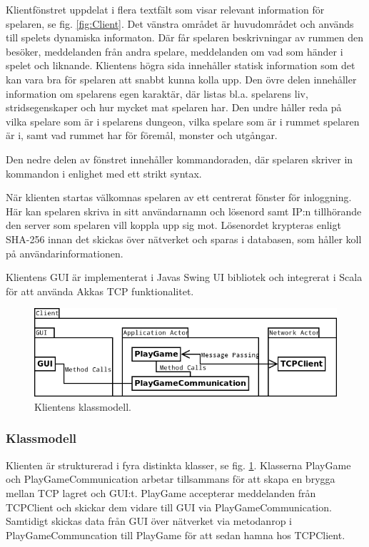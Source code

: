 \documentclass[a4paper]{article}
\begin{document}
Klientfönstret uppdelat i flera textfält som visar relevant information för spelaren, se fig. \ref{fig:Client}. Det vänstra området är huvudområdet och används till spelets dynamiska informaton. Där får spelaren beskrivningar av rummen den besöker, meddelanden från andra spelare, meddelanden om vad som händer i spelet och liknande. Klientens högra sida innehåller statisk information som det kan vara bra för spelaren att snabbt kunna kolla upp. Den övre delen innehåller information om spelarens egen karaktär, där listas bl.a. spelarens liv, stridsegenskaper och hur mycket mat spelaren har. Den undre håller reda på vilka spelare som är i spelarens dungeon, vilka spelare som är i rummet spelaren är i, samt vad rummet har för föremål, monster och utgångar.   

Den nedre delen av fönstret innehåller kommandoraden, där spelaren skriver in kommandon i enlighet med ett strikt syntax. 

När klienten startas välkomnas spelaren av ett centrerat fönster för inloggning. Här kan spelaren skriva in sitt användarnamn och lösenord samt IP:n tillhörande den server som spelaren vill koppla upp sig mot. Lösenordet krypteras enligt SHA-256 innan det skickas över nätverket och sparas i databasen, som håller koll på användarinformationen. 

Klientens GUI är implementerat i Javas Swing UI bibliotek och integrerat i Scala för att använda Akkas TCP funktionalitet.

\begin{figure}[hbt]
\centering
\includegraphics[width=1.0\textwidth]{clientuml1}
\caption{\label{fig:ClientArch}Klientens klassmodell.}
\end{figure}
    
\subsubsection{Klassmodell}
Klienten är strukturerad i fyra distinkta klasser, se fig. \ref{fig:ClientArch}. Klasserna PlayGame och PlayGameCommunication arbetar tillsammans för att skapa en brygga mellan TCP lagret och GUI:t. PlayGame accepterar meddelanden från TCPClient och skickar dem vidare till GUI via PlayGameCommunication. Samtidigt skickas data från GUI över nätverket via metodanrop i PlayGameCommuncation till PlayGame för att sedan hamna hos TCPClient.
\end{document}
